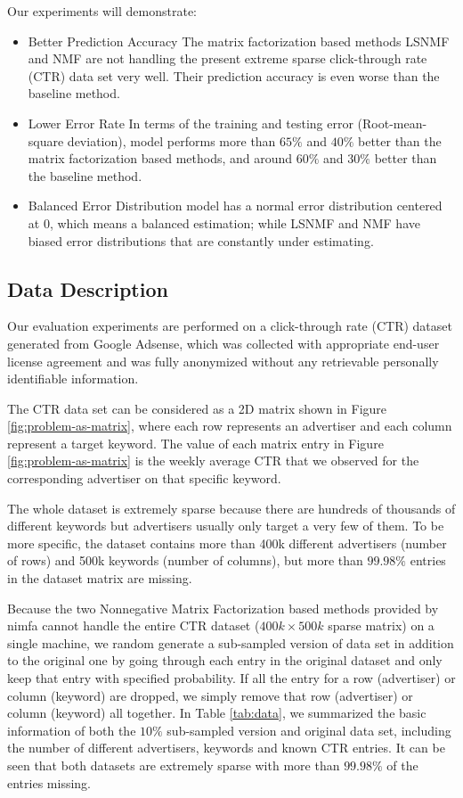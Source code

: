 Our experiments will demonstrate:
\begin{itemize} \itemsep -2pt
\item {Better Prediction Accuracy} The matrix factorization based
  methods LSNMF and NMF are not handling the present extreme sparse
  click-through rate (CTR) data set very well. Their prediction
  accuracy is even worse than the baseline method.
\item {Lower Error Rate} In terms of the training and testing error
  (Root-mean-square deviation), {\sppan} model performs more than
  $65\%$ and $40\%$ better than the matrix factorization based
  methods, and around $60\%$ and $30\%$ better than the baseline
  method.
\item {Balanced Error Distribution} {\sppan} model has a normal error
  distribution centered at 0, which means a balanced estimation; while
  LSNMF and NMF have biased error distributions that are constantly
  under estimating.
\end{itemize}

\subsection{Data Description}
\label{sec:data_desc}
Our evaluation experiments are performed on a click-through rate (CTR)
dataset generated from Google Adsense, which was collected with
appropriate end-user license agreement and was fully anonymized
without any retrievable personally identifiable information.

The CTR data set can be considered as a 2D matrix shown in Figure
\ref{fig:problem-as-matrix}, where each row represents an advertiser
and each column represent a target keyword. The value of each matrix
entry in Figure \ref{fig:problem-as-matrix} is the weekly average CTR
that we observed for the corresponding advertiser on that specific
keyword.

The whole dataset is extremely sparse because there are hundreds of
thousands of different keywords but advertisers usually only target a
very few of them. To be more specific, the dataset contains more than
400k different advertisers (number of rows) and 500k keywords (number
of columns), but more than $99.98\%$ entries in the dataset matrix are
missing.

Because the two Nonnegative Matrix Factorization based methods
provided by nimfa cannot handle the entire CTR dataset ($400k \times
500k$ sparse matrix) on a single machine, we random generate a
sub-sampled version of data set in addition to the original one by
going through each entry in the original dataset and only keep that
entry with specified probability. If all the entry for a row
(advertiser) or column (keyword) are dropped, we simply remove that
row (advertiser) or column (keyword) all together. In Table
\ref{tab:data}, we summarized the basic information of both the $10\%$
sub-sampled version and original data set, including the number of
different advertisers, keywords and known CTR entries. It can be seen
that both datasets are extremely sparse with more than $99.98\%$ of
the entries missing.

